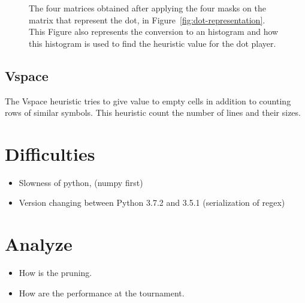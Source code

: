 \documentclass[runningheads]{llncs}
\begin{document}
\begin{figure}[ht]
		\caption{The four matrices obtained after applying the four masks on the matrix that represent the dot, in Figure~\ref{fig:dot-representation}.
						This Figure also represents the conversion to an histogram and how this histogram is used to find the heuristic value for the dot player.}
		\label{fig:convolution-results}
\end{figure}

\subsection{Vspace}
The Vspace heuristic tries to give value to empty
cells in addition to counting rows of similar
symbols. This heuristic count the number of lines
and their sizes.
\section{Difficulties}
\begin{itemize}
		\item Slowness of python, (numpy first)
		\item Version changing between Python 3.7.2 and 3.5.1 (serialization of regex)
\end{itemize}
\section{Analyze}
\begin{itemize}
		\item How is the pruning.
		\item How are the performance at the tournament.
\end{itemize}
\end{document}
